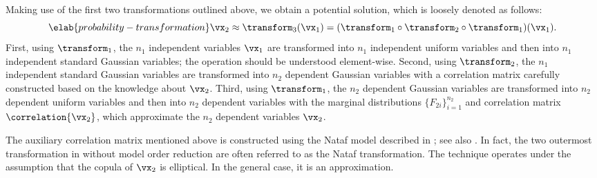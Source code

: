 Making use of the first two transformations outlined above, we obtain a
potential solution, which is loosely denoted as follows:
\begin{equation} \elab{probability-transformation}
  \vx_2 \approx \transform_3(\vx_1) = (\transform_1 \circ \transform_2 \circ \transform_1)(\vx_1).
\end{equation}
First, using $\transform_1$, the $n_1$ independent variables $\vx_1$ are
transformed into $n_1$ independent uniform variables and then into $n_1$
independent standard Gaussian variables; the operation should be understood
element-wise. Second, using $\transform_2$, the $n_1$ independent standard
Gaussian variables are transformed into $n_2$ dependent Gaussian variables with
a correlation matrix carefully constructed based on the knowledge about $\vx_2$.
Third, using $\transform_1$, the $n_2$ dependent Gaussian variables are
transformed into $n_2$ dependent uniform variables and then into $n_2$ dependent
variables with the marginal distributions $\{ F_{2i} \}_{i = 1}^{n_2}$ and
correlation matrix $\correlation{\vx_2}$, which approximate the $n_2$ dependent
variables $\vx_2$.

The auxiliary correlation matrix mentioned above is constructed using the Nataf
model described in \cite{liu1986}; see also \cite{li2008}. In fact, the two
outermost transformation in  without model
order reduction are often referred to as the Nataf transformation. The technique
operates under the assumption that the copula of $\vx_2$ is elliptical. In the
general case, it is an approximation.
